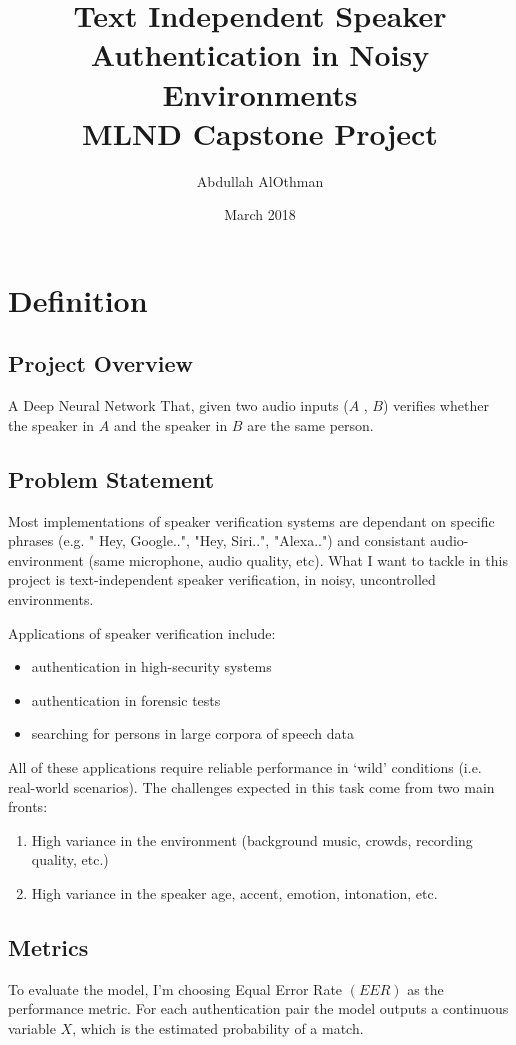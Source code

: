 \documentclass{article}
\title{Text Independent Speaker Authentication in Noisy Environments \\
        \large MLND Capstone Project}
\author{Abdullah AlOthman}
\date{March 2018}
\begin{document}
\maketitle
\section{Definition}

\subsection{Project Overview}

A Deep Neural Network That, given two audio inputs ($A$ , $B$) verifies whether the speaker in $A$ and the speaker in $B$ are the same person.

\subsection{Problem Statement} \label{prblmstmt}
Most implementations of speaker verification systems are dependant on specific phrases (e.g. " Hey, Google..", "Hey, Siri..", "Alexa..") and consistant audio-environment (same microphone, audio quality, etc).
What I want to tackle in this project is text-independent speaker verification, in noisy, uncontrolled environments.

Applications of speaker verification include:
\begin{itemize}
    \item authentication in high-security systems
    \item authentication in forensic tests
    \item searching for persons in large corpora of speech data
\end{itemize}
All of these applications require reliable performance in ‘wild’ conditions (i.e. real-world scenarios). The challenges expected in this task come from two main fronts:
\begin{enumerate}
    \item High variance in the environment (background music, crowds, recording quality, etc.)
    \item High variance in the speaker age, accent, emotion, intonation, etc.
\end{enumerate}

\subsection{Metrics}
To evaluate the model, I'm choosing Equal Error Rate $(EER)$ as the performance metric.
For each authentication pair the model outputs a continuous variable $X$, which is the estimated probability of a match.
\end{document}
